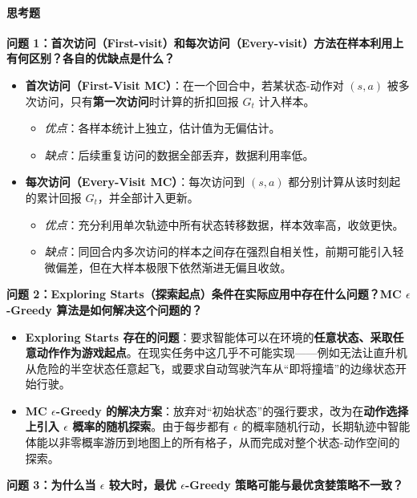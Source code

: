 \documentclass[11pt,a4paper,UTF8]{ctexart}
\numberwithin{figure}{section}
\numberwithin{table}{section}
\newcommand{\answerlabel}{%
  \par\smallskip\noindent{\heiti\bfseries 回答：}\quad}
\begin{document}
\paragraph{思考题}


\textbf{问题 1：首次访问（First-visit）和每次访问（Every-visit）方法在样本利用上有何区别？各自的优缺点是什么？}


\answerlabel 
\begin{itemize}
\item \textbf{首次访问（First-Visit MC）}：在一个回合中，若某状态-动作对 $(s,a)$ 被多次访问，只有\textbf{第一次访问}时计算的折扣回报 $G_t$ 计入样本。
  \begin{itemize}
  \item \textit{优点}：各样本统计上独立，估计值为无偏估计。
  \item \textit{缺点}：后续重复访问的数据全部丢弃，数据利用率低。
  \end{itemize}
\item \textbf{每次访问（Every-Visit MC）}：每次访问到 $(s,a)$ 都分别计算从该时刻起的累计回报 $G_t$，并全部计入更新。
  \begin{itemize}
  \item \textit{优点}：充分利用单次轨迹中所有状态转移数据，样本效率高，收敛更快。
  \item \textit{缺点}：同回合内多次访问的样本之间存在强烈自相关性，前期可能引入轻微偏差，但在大样本极限下依然渐进无偏且收敛。
  \end{itemize}
\end{itemize}


\textbf{问题 2：Exploring Starts（探索起点）条件在实际应用中存在什么问题？MC $\epsilon$-Greedy 算法是如何解决这个问题的？}


\answerlabel 
\begin{itemize}
\item \textbf{Exploring Starts 存在的问题}：要求智能体可以在环境的\textbf{任意状态、采取任意动作作为游戏起点}。在现实任务中这几乎不可能实现——例如无法让直升机从危险的半空状态任意起飞，或要求自动驾驶汽车从``即将撞墙''的边缘状态开始行驶。
\item \textbf{MC $\epsilon$-Greedy 的解决方案}：放弃对``初始状态''的强行要求，改为在\textbf{动作选择上引入 $\epsilon$ 概率的随机探索}。由于每步都有 $\epsilon$ 的概率随机行动，长期轨迹中智能体能以非零概率游历到地图上的所有格子，从而完成对整个状态-动作空间的探索。
\end{itemize}


\textbf{问题 3：为什么当 $\epsilon$ 较大时，最优 $\epsilon$-Greedy 策略可能与最优贪婪策略不一致？}
\end{document}
